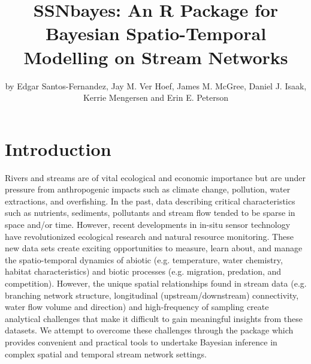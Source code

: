 
 

\title{SSNbayes: An R Package for Bayesian Spatio-Temporal Modelling on Stream Networks}
\author{by Edgar Santos-Fernandez, Jay M. Ver Hoef, James M. McGree, Daniel J. Isaak, Kerrie Mengersen and Erin E. Peterson}


\maketitle



\section{Introduction}

Rivers and streams are of vital ecological and economic importance \citep{vorosmarty2010global} but are under pressure from anthropogenic impacts such as climate change, pollution, water extractions, and overfishing. In the past, data describing critical characteristics such as nutrients, sediments, pollutants and stream flow tended to be sparse in space and/or time. However, recent developments in in-situ sensor technology have revolutionized ecological research and natural resource monitoring. These new data sets create exciting opportunities to measure, learn about, and manage the spatio-temporal dynamics of abiotic (e.g. temperature, water chemistry, habitat characteristics) and biotic processes (e.g. migration, predation, and competition). However, the unique spatial relationships found in stream data (e.g. branching network structure, longitudinal (upstream/downstream) connectivity, water flow volume and direction) and high-frequency of sampling create analytical challenges that make it difficult to gain meaningful insights from these datasets. We attempt to overcome these challenges through the  package which provides convenient and practical tools to undertake Bayesian inference in complex spatial and temporal stream network settings.  




